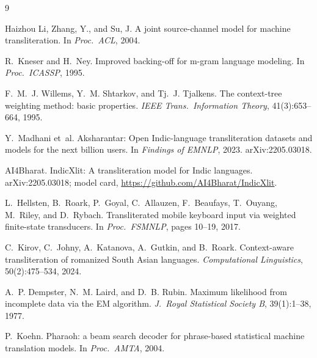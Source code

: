 \documentclass[11pt,a4paper]{article}
\begin{document}

\begin{thebibliography}{9}

Haizhou Li, Zhang, Y., and Su, J.
\newblock A joint source-channel model for machine transliteration.
\newblock In \emph{Proc.\ ACL}, 2004.

R.~Kneser and H.~Ney.
\newblock Improved backing-off for m-gram language modeling.
\newblock In \emph{Proc.\ ICASSP}, 1995.

F.~M.~J. Willems, Y.~M. Shtarkov, and Tj.~J. Tjalkens.
\newblock The context-tree weighting method: basic properties.
\newblock \emph{IEEE Trans.\ Information Theory}, 41(3):653--664, 1995.

Y.~Madhani et~al.
\newblock Aksharantar: Open Indic-language transliteration datasets and
models for the next billion users.
\newblock In \emph{Findings of EMNLP}, 2023. arXiv:2205.03018.

AI4Bharat.
\newblock IndicXlit: A transliteration model for Indic languages.
\newblock arXiv:2205.03018; model card, \url{https://github.com/AI4Bharat/IndicXlit}.

L.~Hellsten, B.~Roark, P.~Goyal, C.~Allauzen, F.~Beaufays, T.~Ouyang,
M.~Riley, and D.~Rybach.
\newblock Transliterated mobile keyboard input via weighted finite-state
transducers.
\newblock In \emph{Proc.\ FSMNLP}, pages 10--19, 2017.

C.~Kirov, C.~Johny, A.~Katanova, A.~Gutkin, and B.~Roark.
\newblock Context-aware transliteration of romanized South Asian languages.
\newblock \emph{Computational Linguistics}, 50(2):475--534, 2024.

A.~P. Dempster, N.~M. Laird, and D.~B. Rubin.
\newblock Maximum likelihood from incomplete data via the EM algorithm.
\newblock \emph{J.\ Royal Statistical Society B}, 39(1):1--38, 1977.

P.~Koehn.
\newblock Pharaoh: a beam search decoder for phrase-based statistical
machine translation models.
\newblock In \emph{Proc.\ AMTA}, 2004.

\end{thebibliography}
\end{document}
